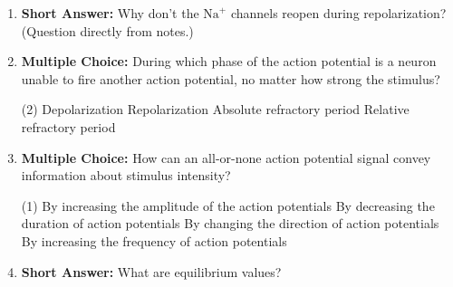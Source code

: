 \begin{enumerate}[label=\textbf{Q2.3.\arabic*}]

      \item \textbf{Short Answer:} Why don't the \(\text{Na}^{+}\) channels reopen during repolarization? (Question directly from notes.) \\

      \item \textbf{Multiple Choice:} During which phase of the action potential is a neuron unable to fire another action potential, no matter how strong the stimulus?
            \begin{tasks}[label=\textcolor{\documentTheme}{(\Alph*)}, item-format=\color{\documentTheme}, label-width=1.5em, item-indent=1.7em](2)
                  \task Depolarization
                  \task Repolarization
                  \task Absolute refractory period
                  \task Relative refractory period
            \end{tasks}

      \item \textbf{Multiple Choice:} How can an all-or-none action potential signal convey information about stimulus intensity?
            \begin{tasks}[label=\textcolor{\documentTheme}{(\Alph*)}, item-format=\color{\documentTheme}, label-width=1.5em, item-indent=1.7em](1)
                  \task By increasing the amplitude of the action potentials
                  \task By decreasing the duration of action potentials
                  \task By changing the direction of action potentials
                  \task By increasing the frequency of action potentials
            \end{tasks}

      \item \textbf{Short Answer:} What are equilibrium values? \\


\end{enumerate}
